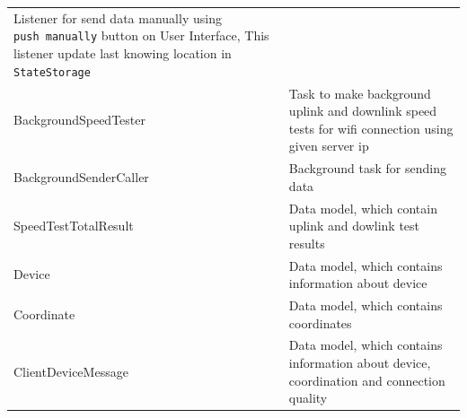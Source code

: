 \begin{longtable}[]{@{}ll@{}}
\begin{minipage}[t]{0.6\columnwidth}
Listener for send data manually using \texttt{push\ manually} button on
User Interface, This listener update last knowing location in
\texttt{StateStorage}\strut
\end{minipage}\tabularnewline
\begin{minipage}[t]{0.3\columnwidth}\raggedright
BackgroundSpeedTester\strut
\end{minipage} & \begin{minipage}[t]{0.6\columnwidth}\raggedright
Task to make background uplink and downlink speed tests for wifi
connection using given server ip\strut
\end{minipage}\tabularnewline
\begin{minipage}[t]{0.3\columnwidth}\raggedright
BackgroundSenderCaller\strut
\end{minipage} & \begin{minipage}[t]{0.6\columnwidth}\raggedright
Background task for sending data\strut
\end{minipage}\tabularnewline
\begin{minipage}[t]{0.3\columnwidth}\raggedright
SpeedTestTotalResult\strut
\end{minipage} & \begin{minipage}[t]{0.6\columnwidth}\raggedright
Data model, which contain uplink and dowlink test results\strut
\end{minipage}\tabularnewline
\begin{minipage}[t]{0.3\columnwidth}\raggedright
Device\strut
\end{minipage} & \begin{minipage}[t]{0.6\columnwidth}\raggedright
Data model, which contains information about device\strut
\end{minipage}\tabularnewline
\begin{minipage}[t]{0.3\columnwidth}\raggedright
Coordinate\strut
\end{minipage} & \begin{minipage}[t]{0.6\columnwidth}\raggedright
Data model, which contains coordinates\strut
\end{minipage}\tabularnewline
\begin{minipage}[t]{0.3\columnwidth}\raggedright
ClientDeviceMessage\strut
\end{minipage} & \begin{minipage}[t]{0.6\columnwidth}\raggedright
Data model, which contains information about device, coordination and
connection quality\strut
\end{minipage}\tabularnewline
\bottomrule
\end{longtable}
